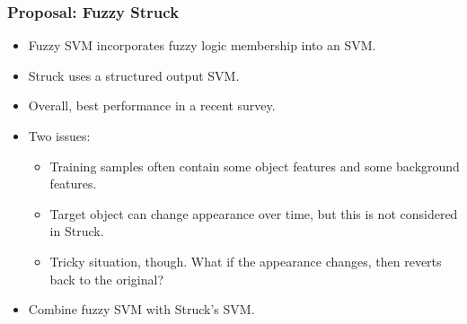 \begin{frame}
    \frametitle{Proposal: Fuzzy Struck}
    \begin{itemize}
        \item Fuzzy SVM incorporates fuzzy logic membership into an SVM. \cite{991432}
        \item Struck uses a structured output SVM. \cite{6126251} \cite{Schwenker2014}
        \item Overall, best performance in a recent survey. \cite{6671560}
        \item Two issues:
            \begin{itemize}
                \item Training samples often contain some object features and some background
                    features.
                \item Target object can change appearance over time, but this is not considered in
                    Struck.
                \item Tricky situation, though. What if the appearance changes, then reverts back to
                    the original?
            \end{itemize}
        \item Combine fuzzy SVM with Struck's SVM.
    \end{itemize}
\end{frame}
